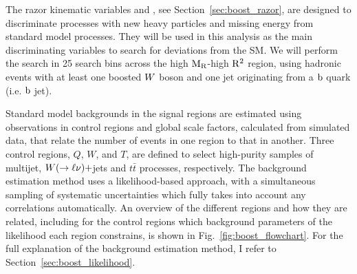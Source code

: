 The razor kinematic variables \mr and \rsq, see Section~\ref{sec:boost_razor}, are designed to
discriminate processes with new heavy particles and missing energy from standard model processes.
They will be used in this analysis as the main discriminating variables to search for deviations
from the SM. We will perform the search in 25 search bins across the high $\mathrm{M_R}$-high $\mathrm{R^2}$ region,
using hadronic events with at least one boosted $W$ boson and one jet originating from a $\mathrm{b}$
quark (i.e. $\mathrm{b}$ jet). 

Standard model backgrounds in the signal regions are estimated using observations in control regions
and global scale factors, calculated from simulated data, that relate the number of events in one
region to that in another. 
Three control regions, $Q$, $W$, and $T$, are defined to select high-purity samples of multijet,
$W(\rightarrow \ell\nu)+$jets and $t\bar{t}$ processes, respectively.  
The background estimation method uses a likelihood-based approach, with a simultaneous sampling
of systematic uncertainties which fully takes into account any correlations automatically.
An overview of the different regions and how they are related, including for the control regions
which background parameters of the likelihood each region constrains, is shown in
Fig.~\ref{fig:boost_flowchart}. For the full explanation of the background estimation method, I
refer to Section~\ref{sec:boost_likelihood}. 

